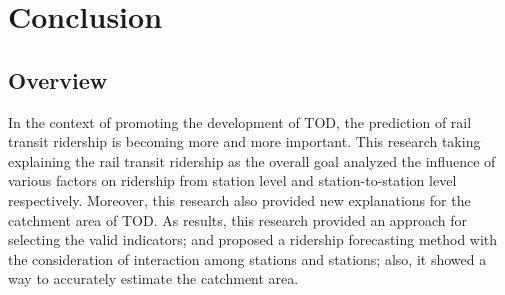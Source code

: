 \chapter{Conclusion}
%
\section{Overview}
In the context of promoting the development of TOD, the prediction of rail transit ridership is becoming more and more important. This research taking explaining the rail transit ridership as the overall goal analyzed the influence of various factors on ridership from station level and station-to-station level respectively. Moreover, this research also provided new explanations for the catchment area of TOD. As results, this research provided an approach for selecting the valid indicators; and proposed a ridership forecasting method with the consideration of interaction among stations and stations; also, it showed a way to accurately estimate the catchment area.


